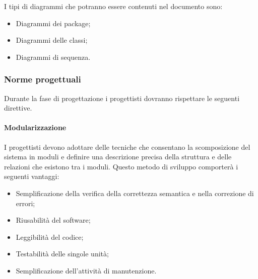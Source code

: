\documentclass[../NormeDiProgetto.tex]{subfiles}
\begin{document}
                  I tipi di diagrammi che potranno essere contenuti nel documento sono:
                  \begin{itemize}
                        \item Diagrammi dei package;
                        \item Diagrammi delle classi;
                        \item Diagrammi di sequenza.
                  \end{itemize}

            \subsubsection{Norme progettuali}
                  Durante la fase di progettazione i progettisti dovranno rispettare le seguenti direttive.
                  \paragraph{Modularizzazione}
                        I progettisti devono adottare delle tecniche che consentano la scomposizione del sistema in moduli e 
                        definire una descrizione precisa della struttura e delle relazioni che esistono tra i moduli.
                        Questo metodo di sviluppo comporterà i seguenti vantaggi:
                        \begin{itemize}
                              \item Semplificazione della verifica della correttezza semantica e nella correzione di errori;
                              \item Riusabilità del software;
                              \item Leggibilità del codice;
                              \item Testabilità delle singole unità;
                              \item Semplificazione dell’attività di manutenzione.
                        \end{itemize}
\end{document}
